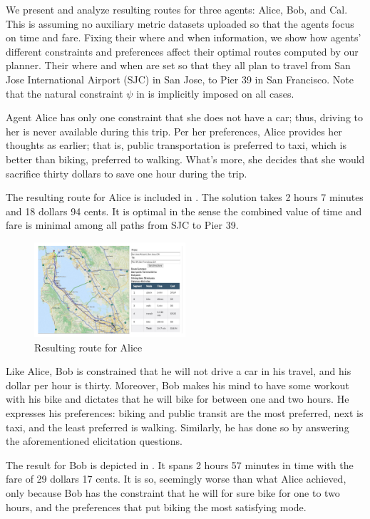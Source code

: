 We present and analyze resulting routes for three agents:
Alice, Bob, and Cal.
This is assuming no auxiliary metric datasets uploaded
so that the agents focus on time and fare.
Fixing their where and when information, we show how
agents' different constraints and preferences affect
their optimal routes computed by our planner.
Their where and when are set so that they all plan to
travel from San Jose International Airport (SJC) in
San Jose, to Pier 39 in San Francisco.
Note that the natural constraint $\psi$ in  
is implicitly imposed on all cases.

Agent Alice has only one constraint that she does not 
have a car; thus, driving to her is never available during this trip.
Per her preferences, Alice provides her thoughts as earlier;
that is, public transportation is preferred to taxi, which is
better than biking, preferred to walking.
What's more, she decides that she would sacrifice thirty dollars
to save one hour during the trip.

The resulting route for Alice is included in .
The solution takes 2 hours 7 minutes and 18 dollars 94 cents.
It is optimal in the sense the combined value of time
and fare is minimal among all paths from SJC to Pier 39.

\begin{figure}[!ht]
  \centering
    \includegraphics[width=0.5\textwidth]{figs/result_Alice.pdf}
  \caption{Resulting route for Alice\label{fig:alice}}
\end{figure}

Like Alice, Bob is constrained that he will not drive a car in his travel,
and his dollar per hour is thirty.
Moreover, Bob makes his mind to have some workout with his bike and
dictates that he will bike for between one and two hours.
He expresses his preferences: biking and public transit are the most
preferred, next is taxi, and the least preferred is walking.
Similarly, he has done so by answering the aforementioned elicitation questions.

The result for Bob is depicted in .
It spans 2 hours 57 minutes in time with the fare of 29 dollars 17 cents.
It is so, seemingly worse than what Alice achieved, only because Bob has
the constraint that he will for sure bike for one to two hours, and
the preferences that put biking the most satisfying mode.

